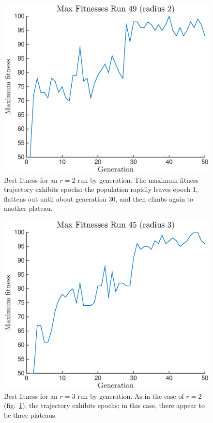 \begin{figure}
\begin{center}
\includegraphics[width=\linewidth]{figures/max_epoch_radius2.eps}
\caption{Best fitness for an $r = 2$ run by generation. The maximum fitness trajectory exhibits epochs: the population rapidly leaves epoch 1, flattens out until about generation 30, and then climbs again to another plateau.}
\label{fig:r2_best_fit}
\end{center}
\end{figure}
\begin{figure} 
\begin{center}
\includegraphics[width=\linewidth]{figures/max_epoch_radius3.eps}
\caption{Best fitness for an $r = 3$ run by generation. As in the case of $r = 2$ (fig.~\ref{fig:r2_best_fit}), the trajectory exhibits epochs; in this case, there appear to be three plateaus.}
\label{fig:r3_best_fit}
\end{center}
\end{figure}

